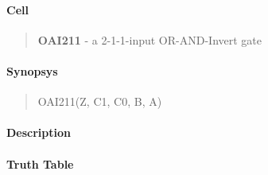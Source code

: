 \label{OAI211}
\paragraph{Cell}
\begin{quote}
    \textbf{OAI211} - a 2-1-1-input OR-AND-Invert gate
\end{quote}

\paragraph{Synopsys}
\begin{quote}
    OAI211(Z, C1, C0, B, A)
\end{quote}

\paragraph{Description}



\paragraph{Truth Table}


